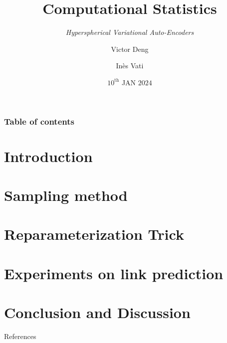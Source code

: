 \documentclass[hyperref={pdftex}]{beamer}
\title{Computational Statistics}
\subtitle{\textit{Hyperspherical Variational Auto-Encoders}}
\author{Victor Deng \and Inès Vati}
\institute[MVA]{École Normale Supérieure Paris-Saclay, Master MVA}
\date{$10^{\textrm{th}}$ JAN $2024$}%
\begin{document}
\frame[plain]{\titlepage}

\begin{frame}
   \frametitle{Table of contents}
   \tableofcontents[subsectionstyle=hide]
\end{frame} 

\section{Introduction} 


\section{Sampling method}



\section{Reparameterization Trick}


\section{Experiments on link prediction}



\section{Conclusion and Discussion} 


\begin{frame}[allowframebreaks]{References}
  
\end{frame}
\end{document}
